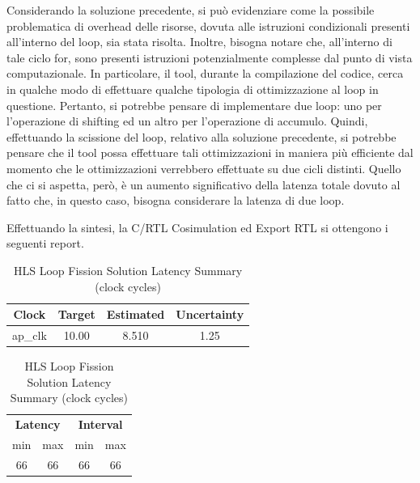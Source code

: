 Considerando la soluzione precedente, si può evidenziare come la possibile problematica di overhead delle risorse, dovuta alle istruzioni condizionali presenti all'interno del loop, sia stata risolta. Inoltre, bisogna notare che, all'interno di tale ciclo for, sono presenti istruzioni potenzialmente complesse dal punto di vista computazionale. In particolare, il tool, durante la compilazione del codice, cerca in qualche modo di effettuare qualche tipologia di ottimizzazione al loop in questione. Pertanto, si potrebbe pensare di implementare due loop: uno per l'operazione di shifting ed un altro per l'operazione di accumulo. Quindi, effettuando la scissione del loop, relativo alla soluzione precedente, si potrebbe pensare che il tool possa effettuare tali ottimizzazioni in maniera più efficiente dal momento che le ottimizzazioni verrebbero effettuate su due cicli distinti. Quello che ci si aspetta, però, è un aumento significativo della latenza totale dovuto al fatto che, in questo caso, bisogna considerare la latenza di due loop.


Effettuando la sintesi, la C/RTL Cosimulation ed Export RTL si ottengono i seguenti report.

\begin{table}[H]
    \centering
    \begin{minipage}[t]{0.45\linewidth}
        \centering
        \begin{tabular}{|c|c|c|c|}
            \hline
            \textbf{Clock} & \textbf{Target} & \textbf{Estimated} & \textbf{Uncertainty} \\
            \hline
            ap\_clk & 10.00 & 8.510 & 1.25 \\
            \hline
        \end{tabular}
        \caption{HLS Loop Fission Solution Timing Summary (ns)}
        \label{tab:hls-loop-fission-solution-timing-summary}
    \end{minipage}
    \hfill
    \begin{minipage}[t]{0.45\linewidth}
        \centering
        \begin{tabular}{|c|c|c|c|}
            \hline
            \multicolumn{2}{|c|}{\textbf{Latency}} & \multicolumn{2}{|c|}{\textbf{Interval}} \\
            min & max & min & max \\
            \hline
            66 & 66 & 66 & 66 \\
            \hline
        \end{tabular}
        \caption{HLS Loop Fission Solution Latency Summary (clock cycles)}
        \label{tab:hls-loop-fission-solution-latency-summary}
    \end{minipage}
\end{table}

